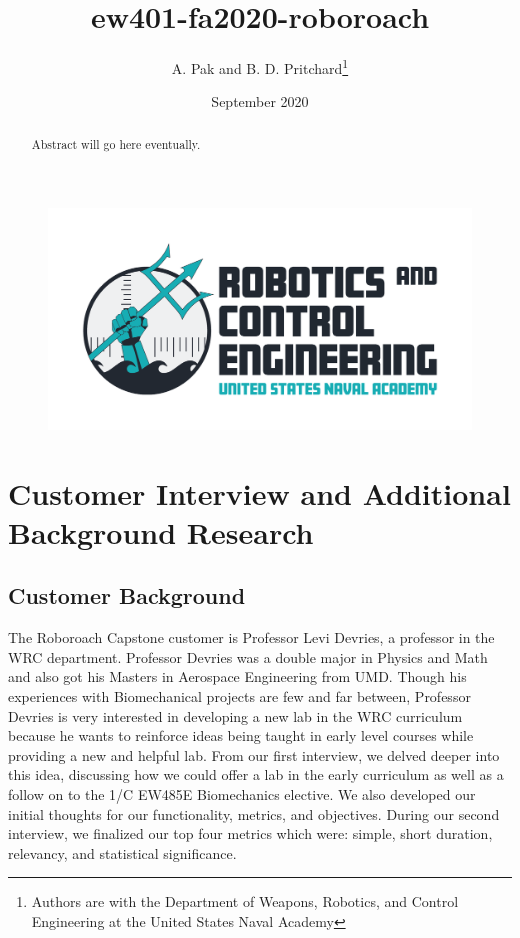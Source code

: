 \documentclass{article}
\title{ew401-fa2020-roboroach}
\author{A. Pak and B. D. Pritchard\thanks{Authors are with the Department of Weapons, Robotics, and Control Engineering at the United States Naval Academy}}
\date{September 2020}
\begin{document}
\maketitle

\begin{figure}[ht!]
\centering
\includegraphics[scale=0.5]{logo.png}

\label{fig:logo}
\end{figure}

\begin{abstract}
Abstract will go here eventually.
\end{abstract}

\section{Customer Interview and Additional Background Research}
\subsection{Customer Background}
\par The Roboroach Capstone customer is Professor Levi Devries, a professor in the WRC department. Professor Devries was a double major in Physics and Math and also got his Masters in Aerospace Engineering from UMD. Though his experiences with Biomechanical projects are few and far between, Professor Devries is very interested in developing a new lab in the WRC curriculum because he wants to reinforce ideas being taught in early level courses while providing a new and helpful lab. From our first interview, we delved deeper into this idea, discussing how we could offer a lab in the early curriculum as well as a follow on to the 1/C EW485E Biomechanics elective. We also developed our initial thoughts for our functionality, metrics, and objectives. During our second interview, we finalized our top four metrics which were: simple, short duration, relevancy, and statistical significance. 
\end{document}
